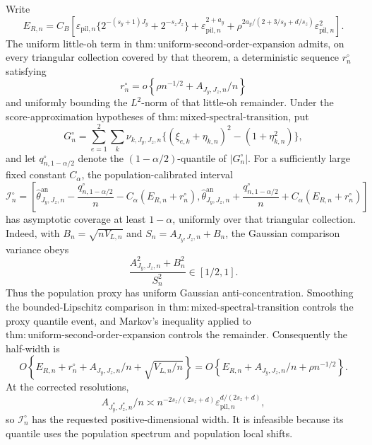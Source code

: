 Write
\[
E_{R,n}=C_B\left[
\varepsilon_{\mathrm{pil},n}
\{2^{-(s_y+1)J_y}+2^{-s_zJ_z}\}
+\varepsilon_{\mathrm{pil},n}^{2+a_y}
+\rho^{2a_y/(2+3/s_y+d/s_z)}\varepsilon_{\mathrm{pil},n}^2
\right].
\]
The uniform little-oh term in
\(\mathrm{thm{:}uniform\text{-}second\text{-}order\text{-}expansion}\)
admits, on every triangular collection covered by that theorem, a deterministic
sequence \(r_n^\circ\) satisfying
\[
r_n^\circ=o\!\left\{\rho n^{-1/2}+A_{J_y,J_z,n}/n\right\}
\]
and uniformly bounding the \(L^2\)-norm of that little-oh remainder.  Under the
score-approximation hypotheses of
\(\mathrm{thm{:}mixed\text{-}spectral\text{-}transition}\), put
\[
G_n^\circ=
\sum_{e=1}^2\sum_k\nu_{k,J_y,J_z,n}
\{(\xi_{e,k}+\eta_{k,n})^2-(1+\eta_{k,n}^2)\},
\]
and let \(q_{n,1-\alpha/2}^\circ\) denote the
\((1-\alpha/2)\)-quantile of \(|G_n^\circ|\).  For a sufficiently large fixed
constant \(C_\alpha\), the population-calibrated interval
\[
\mathcal I_n^\circ=
\left[
\widehat\theta^{\mathrm{an}}_{J_y,J_z,n}
-\frac{q_{n,1-\alpha/2}^\circ}{n}
-C_\alpha(E_{R,n}+r_n^\circ),
\widehat\theta^{\mathrm{an}}_{J_y,J_z,n}
+\frac{q_{n,1-\alpha/2}^\circ}{n}
+C_\alpha(E_{R,n}+r_n^\circ)
\right]
\]
has asymptotic coverage at least \(1-\alpha\), uniformly over that triangular
collection.  Indeed, with
\(B_n=\sqrt{nV_{L,n}}\) and
\(S_n=A_{J_y,J_z,n}+B_n\), the Gaussian comparison variance obeys
\[
\frac{A_{J_y,J_z,n}^2+B_n^2}{S_n^2}\in[1/2,1].
\]
Thus the population proxy has uniform Gaussian anti-concentration.  Smoothing
the bounded-Lipschitz comparison in
\(\mathrm{thm{:}mixed\text{-}spectral\text{-}transition}\) controls the proxy
quantile event, and Markov's inequality applied to
\(\mathrm{thm{:}uniform\text{-}second\text{-}order\text{-}expansion}\)
controls the remainder.  Consequently the half-width is
\[
O\!\left\{
E_{R,n}+r_n^\circ+A_{J_y,J_z,n}/n+\sqrt{V_{L,n}/n}
\right\}
=O\!\left\{E_{R,n}+A_{J_y,J_z,n}/n+\rho n^{-1/2}\right\}.
\]
At the corrected resolutions,
\[
A_{J_y^*,J_z^*,n}/n
\asymp n^{-2s_z/(2s_z+d)}
\varepsilon_{\mathrm{pil},n}^{d/(2s_z+d)},
\]
so \(\mathcal I_n^\circ\) has the requested positive-dimensional width.  It
is infeasible because its quantile uses the population spectrum and population
local shifts.

